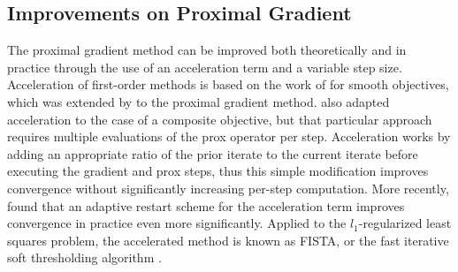 \subsection{Improvements on Proximal Gradient}
The proximal gradient method can be improved both theoretically and in practice through the use of an acceleration term and a variable step size. Acceleration of first-order methods is based on the work of \textcite{Nes83, Nes88} for smooth objectives, which was extended by \textcite{BT09, BT10} to the proximal gradient method. \textcite{Nes07} also adapted acceleration to the case of a composite objective, but that particular approach requires multiple evaluations of the prox operator per step. Acceleration works by adding an appropriate ratio of the prior iterate to the current iterate before executing the gradient and prox steps, thus this simple modification improves convergence without significantly increasing per-step computation. More recently, \textcite{OC13} found that an adaptive restart scheme for the acceleration term improves convergence in practice even more significantly. Applied to the $l_1$-regularized least squares problem, the accelerated method is known as FISTA, or the fast iterative soft thresholding algorithm \autocite{BT09}.

